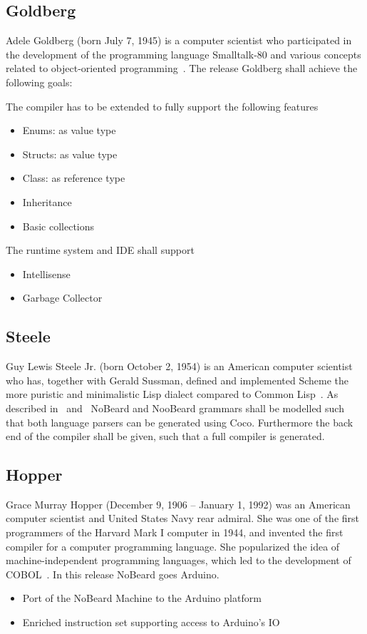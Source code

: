\documentclass[11pt]{article}
\begin{document}
\subsection{Goldberg}
Adele Goldberg (born July 7, 1945) is a computer scientist who participated in the development of the programming language Smalltalk-80 and various concepts related to object-oriented programming~\cite{wikipedia_adele_2015}. The release Goldberg shall achieve the following goals:

The compiler has to be extended to fully support the following features
\begin{itemize}
	\item Enums: as value type
	\item Structs: as value type
	\item Class: as reference type
	\item Inheritance
	\item Basic collections
\end{itemize} 

The runtime system and IDE shall support
\begin{itemize}
	\item Intellisense
	\item Garbage Collector
\end{itemize}

\subsection{Steele}
Guy Lewis Steele Jr. (born  October 2, 1954) is an American computer scientist who has, together with Gerald Sussman, defined and implemented Scheme the more puristic and minimalistic Lisp dialect compared to Common Lisp~\cite{wikipedia_guy_2015}. As described in~\cite{rechenberg_compiler-generator_1988} and~\cite{terry_compiling_2004} NoBeard and NooBeard grammars shall be modelled such that both language parsers can be generated using Coco. Furthermore the back end of the compiler shall be given, such that a full compiler is generated.

\subsection{Hopper}
Grace Murray Hopper (December 9, 1906 -- January 1, 1992) was an American computer scientist and United States Navy rear admiral. She was one of the first programmers of the Harvard Mark I computer in 1944, and invented the first compiler for a computer programming language. She popularized the idea of machine-independent programming languages, which led to the development of COBOL~\cite{wikipedia_grace_2015}. In this release NoBeard goes Arduino.
\begin{itemize}
	\item Port of the NoBeard Machine to the Arduino platform
	\item Enriched instruction set supporting access to Arduino's IO
\end{itemize}

{}

\end{document}
